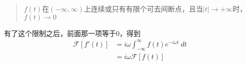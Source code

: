 \documentclass[UTF8]{ctexbook}
\begin{document}
\begin{enumerate}
					\begin{quote}
						$f(t)$在$(-\infty, \infty)$上连续或只有有限个可去间断点，且当$|t|\to +\infty$时，$f(t)\to 0$
					\end{quote}
		
					有了这个限制之后，前面那一项等于0，得到
					\begin{equation}
						\begin{split}
						\mathscr{F}[f'(t)]&=i\omega\int_{-\infty}^{\infty}f(t)e^{-i\omega t}\ dt\\
						&=i\omega\mathscr{F}[f(t)]
						\end{split}
					\end{equation}
		
		
		




\end{enumerate}
\end{document}
